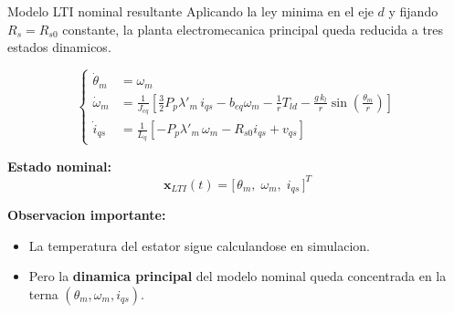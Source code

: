\documentclass[aspectratio=169,t]{beamer}
\begin{document}
\begin{frame}{Modelo LTI nominal resultante}
{\small\color{uncGray}Aplicando la ley minima en el eje $d$ y fijando $R_s=R_{s0}$ constante, la planta electromecanica principal queda reducida a tres estados dinamicos.}\par
\vspace{2mm}

\footnotesize
\begin{equation*}
\left\{
\begin{aligned}
\dot{\theta}_m &= \omega_m \\[2pt]
\dot{\omega}_m &= \frac{1}{J_{eq}}\!\left[\frac{3}{2}P_p\lambda'_m\,i_{qs}-b_{eq}\omega_m-\frac{1}{r}T_{ld}-\frac{g\,k_l}{r}\sin\!\left(\frac{\theta_m}{r}\right)\right] \\[4pt]
\dot{i}_{qs} &= \frac{1}{L_q}\!\left[-P_p\lambda'_m\,\omega_m-R_{s0}i_{qs}+v_{qs}\right]
\end{aligned}
\right.
\end{equation*}
\normalsize

\textbf{Estado nominal:}
\begin{equation*}
\bm{x}_{LTI}(t)=\big[\,\theta_m,\;\omega_m,\;i_{qs}\,\big]^T
\end{equation*}

\textbf{Observacion importante:}
\begin{itemize}
  \item La temperatura del estator sigue calculandose en simulacion.
  \item Pero la \textbf{dinamica principal} del modelo nominal queda concentrada en la terna $(\theta_m,\omega_m,i_{qs})$.
\end{itemize}
\end{frame}
\end{document}
